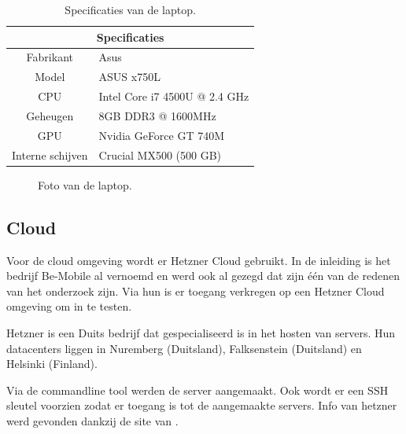 \begin{table}
	\centering
	\begin{tabular}{c l}
		\hline
		\multicolumn{2}{c}{\textbf{Specificaties}} \\
		\hline
		Fabrikant & Asus \\
		\hline
		Model & ASUS x750L \\
		\hline
		CPU & Intel Core i7 4500U @ 2.4 GHz  \\
		\hline
		Geheugen & 8GB DDR3 @ 1600MHz \\
		\hline
		GPU & Nvidia GeForce GT 740M \\
		\hline
		Interne schijven & Crucial MX500 (500 GB) \\
		\hline
	\end{tabular}
	\caption{Specificaties van de laptop.}
	\label{tab:specs_desktop }
\end{table}

\begin{figure}[!htb]
	\caption{Foto van de laptop.}
	\label{fig:asustest}
\end{figure}


\subsection{Cloud}
Voor de cloud omgeving wordt er Hetzner Cloud gebruikt. In de inleiding is het bedrijf Be-Mobile al vernoemd en werd ook al gezegd dat zijn één van de redenen van het onderzoek zijn. Via hun is er toegang verkregen op een Hetzner Cloud omgeving om in te testen. 

Hetzner is een Duits bedrijf dat gespecialiseerd is in het hosten van servers. Hun datacenters liggen in Nuremberg (Duitsland), Falksenstein (Duitsland) en Helsinki (Finland). 

Via de commandline tool werden de server aangemaakt. Ook wordt er een SSH sleutel voorzien zodat er toegang is tot de aangemaakte servers. Info van hetzner werd gevonden dankzij de site van \autocite{hetzner}.

